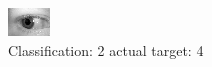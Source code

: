 \begin{figure}[h!]
\begin{center}
\includegraphics[width=0.60\columnwidth]{figures/ID820_class_2_target_4.png}
\end{center}
\caption{ Classification: 2 actual target: 4}
\label{fig:ID820_class_2_target_4}
\end{figure}
